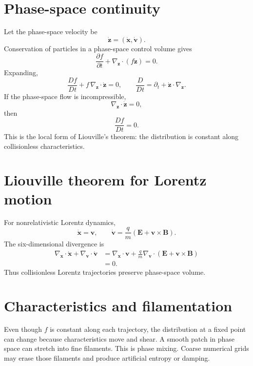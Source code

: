 \documentclass[11pt]{article}
\begin{document}
\section{Phase-space continuity}
Let the phase-space velocity be
\begin{equation}
\dot{\mathbf z}=(\dot{\mathbf x},\dot{\mathbf v}).
\end{equation}
Conservation of particles in a phase-space control volume gives
\begin{equation}
\boxed{\frac{\partial f}{\partial t}+\nabla_{\mathbf z}\cdot(f\dot{\mathbf z})=0}.
\end{equation}
Expanding,
\begin{equation}
\frac{Df}{Dt}+f\,\nabla_{\mathbf z}\cdot\dot{\mathbf z}=0,
\qquad
\frac{D}{Dt}=\partial_t+\dot{\mathbf z}\cdot\nabla_{\mathbf z}.
\end{equation}
If the phase-space flow is incompressible,
\begin{equation}
\nabla_{\mathbf z}\cdot\dot{\mathbf z}=0,
\end{equation}
then
\begin{equation}
\boxed{\frac{Df}{Dt}=0}.
\end{equation}
This is the local form of Liouville's theorem: the distribution is constant along collisionless characteristics.

\section{Liouville theorem for Lorentz motion}
For nonrelativistic Lorentz dynamics,
\begin{equation}
\dot{\mathbf x}=\mathbf v,
\qquad
\dot{\mathbf v}=\frac{q}{m}(\mathbf E+\mathbf v\times\mathbf B).
\end{equation}
The six-dimensional divergence is
\begin{align}
\nabla_{\mathbf x}\cdot\dot{\mathbf x}
+\nabla_{\mathbf v}\cdot\dot{\mathbf v}
&=\nabla_{\mathbf x}\cdot\mathbf v
+\frac{q}{m}\nabla_{\mathbf v}\cdot(\mathbf E+\mathbf v\times\mathbf B)\\
&=0.
\end{align}
Thus collisionless Lorentz trajectories preserve phase-space volume.

\section{Characteristics and filamentation}
Even though $f$ is constant along each trajectory, the distribution at a fixed point can change because characteristics move and shear. A smooth patch in phase space can stretch into fine filaments. This is phase mixing. Coarse numerical grids may erase those filaments and produce artificial entropy or damping.
\end{document}
